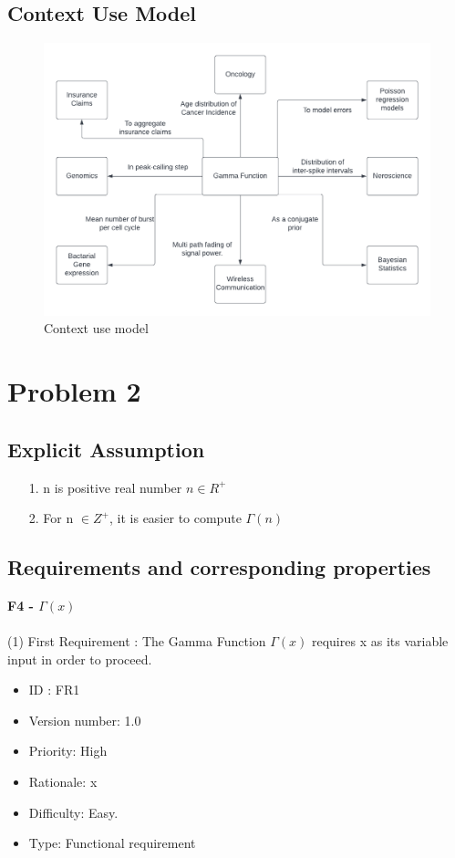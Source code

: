 \documentclass[12pt,a4paper]{report}
\begin{document}
\section{Context Use Model}

\begin{figure}[h]
    \centering
    \includegraphics[width=0.9\linewidth]{Images/contextmodel.png}
    \caption{Context use model}
    \label{fig:context use model}
\end{figure}


\chapter{Problem 2}

\section{Explicit Assumption}
\begin{itemize}
     \item[1.]n is positive real number $n \in R^{+}$
     \item[2.]For n $\in Z^+$, it is easier to compute $\Gamma(n)$
\end{itemize}
\section{Requirements and corresponding properties}
\indent \textbf{F4 - $\Gamma \left( x \right)$} \\ \\
\indent (1) First Requirement : The Gamma Function $\Gamma(x)$ requires x as its variable input in order to proceed.

\begin{itemize}
    \item ID : FR1
    \item Version number: 1.0
    \item Priority: High
    \item Rationale: x
    \item Difficulty: Easy.
    \item Type: Functional requirement
\end{itemize}
\end{document}
